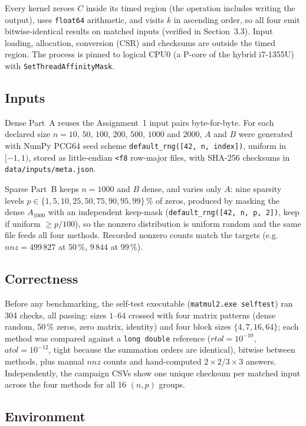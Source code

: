 \documentclass[11pt,a4paper]{article}
\begin{document}
Every kernel zeroes $C$ inside its timed region (the operation includes writing
the output), uses \texttt{float64} arithmetic, and visits $k$ in ascending order,
so all four emit bitwise-identical results on matched inputs (verified in
Section~3.3). Input loading, allocation, conversion (CSR) and checksums are
outside the timed region. The process is pinned to logical CPU0 (a P-core of the
hybrid i7-1355U) with \texttt{SetThreadAffinityMask}.

\subsection{Inputs}

Dense Part~A reuses the Assignment~1 input pairs byte-for-byte. For each
declared size $n = 10$, $50$, $100$, $200$, $500$, $1000$ and $2000$, $A$ and
$B$ were generated with NumPy
PCG64 seed scheme \texttt{default\_rng([42, n, index])}, uniform in $[-1,1)$,
stored as little-endian \texttt{<f8} row-major files, with SHA-256 checksums in
\texttt{data/inputs/meta.json}.

Sparse Part~B keeps $n=1000$ and $B$ dense, and varies only $A$: nine sparsity
levels $p \in \{1,5,10,25,50,75,90,95,99\}$\,\% of zeros, produced by masking
the dense $A_{1000}$ with an independent keep-mask
(\texttt{default\_rng([42, n, p, 2])}, keep if uniform $\ge p/100$), so the
nonzero distribution is uniform random and the same file feeds all four methods.
Recorded nonzero counts match the targets (e.g.\ $nnz = 499\,827$ at 50\,\%,
$9\,844$ at 99\,\%).

\subsection{Correctness}

Before any benchmarking, the self-test executable
(\texttt{matmul2.exe selftest}) ran 304 checks, all passing: sizes $1$--$64$
crossed with four matrix patterns (dense random, 50\,\% zeros, zero matrix,
identity) and four block sizes $\{4,7,16,64\}$; each method was compared against
a \texttt{long double} reference ($rtol = 10^{-10}$, $atol = 10^{-12}$, tight
because the summation orders are identical), bitwise between methods, plus manual
$nnz$ counts and hand-computed $2\times2$/$3\times3$ answers. Independently, the
campaign CSVs show one unique checksum per matched input across the four methods
for all 16 $(n, p)$ groups.

\subsection{Environment}
\end{document}
